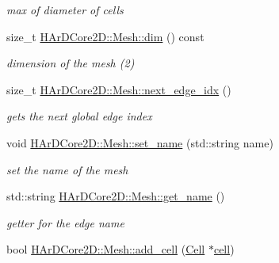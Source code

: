 \begin{DoxyCompactItemize}
\begin{DoxyCompactList}\small\item\em max of diameter of cells \end{DoxyCompactList}\item 
\mbox{\label{group__Mesh_gaecd909db5f3ab863010382cf6b71ec58}} 
size\+\_\+t \hyperlink{group__Mesh_gaecd909db5f3ab863010382cf6b71ec58}{H\+Ar\+D\+Core2\+D\+::\+Mesh\+::dim} () const
\begin{DoxyCompactList}\small\item\em dimension of the mesh (2) \end{DoxyCompactList}\item 
\mbox{\label{group__Mesh_ga950e099c278cd367de1a87c6dcaefafe}} 
size\+\_\+t \hyperlink{group__Mesh_ga950e099c278cd367de1a87c6dcaefafe}{H\+Ar\+D\+Core2\+D\+::\+Mesh\+::next\+\_\+edge\+\_\+idx} ()
\begin{DoxyCompactList}\small\item\em gets the next global edge index \end{DoxyCompactList}\item 
\mbox{\label{group__Mesh_ga6ac77eb1c0d7ed0ccd8567ca03321531}} 
void \hyperlink{group__Mesh_ga6ac77eb1c0d7ed0ccd8567ca03321531}{H\+Ar\+D\+Core2\+D\+::\+Mesh\+::set\+\_\+name} (std\+::string name)
\begin{DoxyCompactList}\small\item\em set the name of the mesh \end{DoxyCompactList}\item 
\mbox{\label{group__Mesh_ga084bd89b4d3767370cbb2da9ffd8ac87}} 
std\+::string \hyperlink{group__Mesh_ga084bd89b4d3767370cbb2da9ffd8ac87}{H\+Ar\+D\+Core2\+D\+::\+Mesh\+::get\+\_\+name} ()
\begin{DoxyCompactList}\small\item\em getter for the edge name \end{DoxyCompactList}\item 
\mbox{\label{group__Mesh_ga59082af6b1da515cdb99c4daacf5e2fd}} 
bool \hyperlink{group__Mesh_ga59082af6b1da515cdb99c4daacf5e2fd}{H\+Ar\+D\+Core2\+D\+::\+Mesh\+::add\+\_\+cell} (\hyperlink{classHArDCore2D_1_1Cell}{Cell} $\ast$\hyperlink{classHArDCore2D_1_1Mesh_ae07b938c57cf57e3bb9c76d3df1eb549}{cell})

\end{DoxyCompactItemize}

